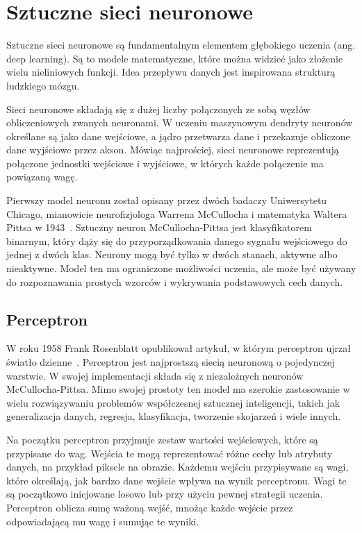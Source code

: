 \section{Sztuczne sieci neuronowe}
\label{sec:artificial-neural-networks}

Sztuczne sieci neuronowe są fundamentalnym elementem głębokiego uczenia (ang. deep learning). Są to modele matematyczne, które można widzieć jako złożenie wielu nieliniowych funkcji. Idea przepływu danych jest inspirowana strukturą ludzkiego mózgu.

Sieci neuronowe składają się z dużej liczby połączonych ze sobą węzłów obliczeniowych zwanych neuronami. W uczeniu maszynowym dendryty neuronów określane są jako dane wejściowe, a jądro przetwarza dane i przekazuje obliczone dane wyjściowe przez akson. Mówiąc najprościej, sieci neuronowe reprezentują połączone jednostki wejściowe i wyjściowe, w których każde połączenie ma powiązaną wagę.

Pierwszy model neuronu został opisany przez dwóch badaczy Uniwersytetu Chicago, mianowicie neurofizjologa Warrena McCullocha i matematyka Waltera Pittsa w 1943~\cite{mcculloch1943}. Sztuczny neuron McCullocha-Pittsa jest klasyfikatorem binarnym, który dąży się do przyporządkowania danego sygnału wejściowego do jednej z dwóch klas. Neurony mogą być tylko w dwóch stanach, aktywne albo
nieaktywne. Model ten ma ograniczone możliwości uczenia, ale może być używany do rozpoznawania prostych wzorców i wykrywania podstawowych cech danych.

\subsection{Perceptron}
\label{subsec:perceptron}

W roku 1958 Frank Rosenblatt opublikował artykuł, w którym perceptron ujrzał światło dzienne~\cite{rosenblatt1958}. Perceptron jest najprostszą siecią neuronową o pojedynczej warstwie. W swojej implementacji składa się z niezależnych neuronów McCullocha-Pittsa. Mimo swojej prostoty ten model ma szerokie zastosowanie w wielu rozwiązywaniu problemów współczesnej sztucznej inteligencji, takich jak generalizacja danych, regresja, klasyfikacja, tworzenie skojarzeń i wiele innych.

Na początku perceptron przyjmuje zestaw wartości wejściowych, które są przypisane do wag. Wejścia te mogą reprezentować różne cechy lub atrybuty danych, na przykład piksele na obrazie. Każdemu wejściu przypisywane są wagi, które określają, jak bardzo dane wejście wpływa na wynik perceptronu. Wagi te są początkowo inicjowane losowo lub przy użyciu pewnej strategii uczenia. Perceptron oblicza sumę ważoną wejść, mnożąc każde wejście przez odpowiadającą mu wagę i sumując te wyniki.


